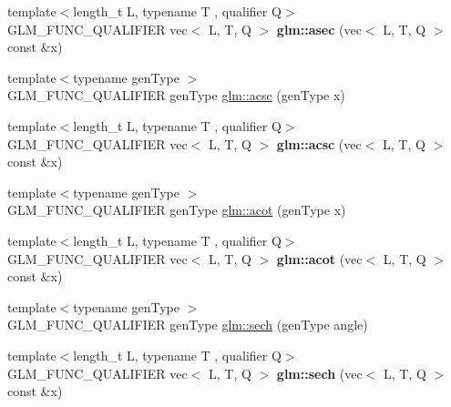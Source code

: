 \begin{DoxyCompactItemize}
\item 
\mbox{\label{reciprocal_8inl_aadaa702084685c248ffa73632a2e16d2}} 
{\footnotesize template$<$length\+\_\+t L, typename T , qualifier Q$>$ }\\G\+L\+M\+\_\+\+F\+U\+N\+C\+\_\+\+Q\+U\+A\+L\+I\+F\+I\+ER vec$<$ L, T, Q $>$ {\bfseries glm\+::asec} (vec$<$ L, T, Q $>$ const \&x)
\item 
{\footnotesize template$<$typename gen\+Type $>$ }\\G\+L\+M\+\_\+\+F\+U\+N\+C\+\_\+\+Q\+U\+A\+L\+I\+F\+I\+ER gen\+Type \hyperlink{group__gtc__reciprocal_ga1b4bed91476b9b915e76b4a30236d330}{glm\+::acsc} (gen\+Type x)
\item 
\mbox{\label{reciprocal_8inl_ae58a6c84037a92ef5700337b85c62c4c}} 
{\footnotesize template$<$length\+\_\+t L, typename T , qualifier Q$>$ }\\G\+L\+M\+\_\+\+F\+U\+N\+C\+\_\+\+Q\+U\+A\+L\+I\+F\+I\+ER vec$<$ L, T, Q $>$ {\bfseries glm\+::acsc} (vec$<$ L, T, Q $>$ const \&x)
\item 
{\footnotesize template$<$typename gen\+Type $>$ }\\G\+L\+M\+\_\+\+F\+U\+N\+C\+\_\+\+Q\+U\+A\+L\+I\+F\+I\+ER gen\+Type \hyperlink{group__gtc__reciprocal_gaeadfb9c9d71093f7865b2ba2ca8d104d}{glm\+::acot} (gen\+Type x)
\item 
\mbox{\label{reciprocal_8inl_a5c9715b17441e74194ec66408d64e708}} 
{\footnotesize template$<$length\+\_\+t L, typename T , qualifier Q$>$ }\\G\+L\+M\+\_\+\+F\+U\+N\+C\+\_\+\+Q\+U\+A\+L\+I\+F\+I\+ER vec$<$ L, T, Q $>$ {\bfseries glm\+::acot} (vec$<$ L, T, Q $>$ const \&x)
\item 
{\footnotesize template$<$typename gen\+Type $>$ }\\G\+L\+M\+\_\+\+F\+U\+N\+C\+\_\+\+Q\+U\+A\+L\+I\+F\+I\+ER gen\+Type \hyperlink{group__gtc__reciprocal_ga9a5cfd1e7170104a7b33863b1b75e5ae}{glm\+::sech} (gen\+Type angle)
\item 
\mbox{\label{reciprocal_8inl_ae0c5d5e96bbdd507a10deaa350afdf01}} 
{\footnotesize template$<$length\+\_\+t L, typename T , qualifier Q$>$ }\\G\+L\+M\+\_\+\+F\+U\+N\+C\+\_\+\+Q\+U\+A\+L\+I\+F\+I\+ER vec$<$ L, T, Q $>$ {\bfseries glm\+::sech} (vec$<$ L, T, Q $>$ const \&x)
\item 

\end{DoxyCompactItemize}
